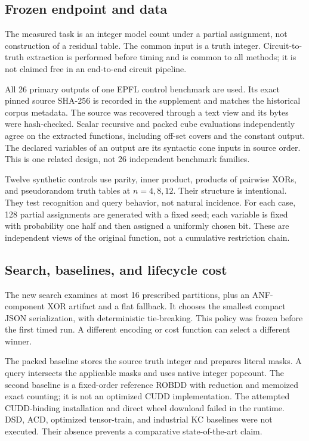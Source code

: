 \documentclass[11pt]{article}
\theoremstyle{definition}\newtheorem{definition}[theorem]{Definition}
\theoremstyle{remark}\newtheorem{remark}[theorem]{Remark}
\begin{document}
\subsection{Frozen endpoint and data}
The measured task is an integer model count under a partial assignment, not construction of a residual table. The common input is a truth integer. Circuit-to-truth extraction is performed before timing and is common to all methods; it is not claimed free in an end-to-end circuit pipeline.

All 26 primary outputs of one EPFL control benchmark are used\cite{epfl}. Its exact pinned source SHA-256 is recorded in the supplement and matches the historical corpus metadata. The source was recovered through a text view and its bytes were hash-checked. Scalar recursive and packed cube evaluations independently agree on the extracted functions, including off-set covers and the constant output. The declared variables of an output are its syntactic cone inputs in source order. This is one related design, not 26 independent benchmark families.

Twelve synthetic controls use parity, inner product, products of pairwise XORs, and pseudorandom truth tables at $n=4,8,12$. Their structure is intentional. They test recognition and query behavior, not natural incidence. For each case, 128 partial assignments are generated with a fixed seed; each variable is fixed with probability one half and then assigned a uniformly chosen bit. These are independent views of the original function, not a cumulative restriction chain.

\subsection{Search, baselines, and lifecycle cost}
The new search examines at most 16 prescribed partitions, plus an ANF-component XOR artifact and a flat fallback. It chooses the smallest compact JSON serialization, with deterministic tie-breaking. This policy was frozen before the first timed run. A different encoding or cost function can select a different winner.

The packed baseline stores the source truth integer and prepares literal masks. A query intersects the applicable masks and uses native integer popcount. The second baseline is a fixed-order reference ROBDD with reduction and memoized exact counting; it is not an optimized CUDD implementation. The attempted CUDD-binding installation and direct wheel download failed in the runtime. DSD, ACD, optimized tensor-train, and industrial KC baselines were not executed. Their absence prevents a comparative state-of-the-art claim.
\end{document}

